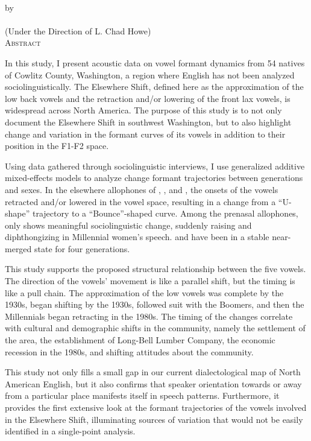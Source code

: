 \setcounter{page}{0}


\vspace*{18pt}
\begin{center}
  \textsc{\Large{\dissertationtitle}}\\[18pt]  %
  by\\[18pt]
  \textsc{\Large\myname}\\[12pt]
  (Under the Direction of L. Chad Howe)\\[12pt]
  \textsc{Abstract}
\end{center}


In this study, I present acoustic data on vowel formant dynamics from 54 natives of Cowlitz County, Washington, a region where English has not been analyzed sociolinguistically. The Elsewhere Shift, defined here as the approximation of the low back vowels and the retraction and/or lowering of the front lax vowels, is widespread across North America. The purpose of this study is to not only document the Elsewhere Shift in southwest Washington, but to also highlight change and variation in the formant curves of its vowels in addition to their position in the F1-F2 space.

Using data gathered through sociolinguistic interviews, I use generalized additive mixed-effects models to analyze change formant trajectories between generations and sexes. In the elsewhere allophones of \trap, \dress, and \kit, the onsets of the vowels retracted and/or lowered in the vowel space, resulting in a change from a ``U-shape'' trajectory to a ``Bounce''-shaped curve. Among the prenasal allophones, only \ban shows meaningful sociolinguistic change, suddenly raising and diphthongizing in Millennial women's speech. \lot and \thought have been in a stable near-merged state for four generations.

This study supports the proposed structural relationship between the five vowels. The direction of the vowels' movement is like a parallel shift, but the timing is like a pull chain. The approximation of the low vowels was complete by the 1930s, \bat began shifting by the 1930s, \bet followed suit with the Boomers, and then the Millennials began retracting \bit in the 1980s. The timing of the changes correlate with cultural and demographic shifts in the community, namely the settlement of the area, the establishment of Long-Bell Lumber Company, the economic recession in the 1980s, and shifting attitudes about the community.

This study not only fills a small gap in our current dialectological map of North American English, but it also confirms that speaker orientation towards or away from a particular place manifests itself in speech patterns. Furthermore, it provides the first extensive look at the formant trajectories of the vowels involved in the Elsewhere Shift, illuminating sources of variation that would not be easily identified in a single-point analysis.


